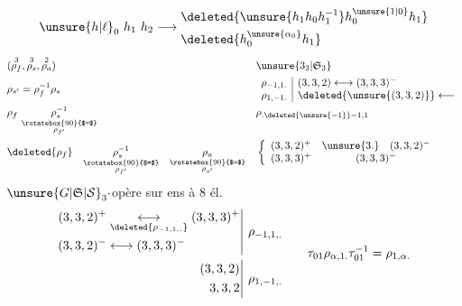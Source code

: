\[
\unsure{h|\ell}_0\ h_1\ h_2\longrightarrow
\begin{aligned}
&\deleted{\unsure{h_1h_0h_1^{-1}}h_0^{\unsure{1|0}}h_1}\\
&\deleted{h_0^{\unsure{\alpha_0}}h_1}
\end{aligned}
\]
\[
\begin{aligned}
 &(\overset{3}{\rho_f},\overset{3}{\rho_s},\overset{2}{\rho_a}) &&\unsure{3_3|\mathfrak S_3}\\
 &\rho_{s'}=\rho_f^{-1}\rho_s &&
 \begin{array}{l|l}
 \rho_{-1,1.}&(3,3,2)\longleftrightarrow(3,3,3)^-\\
 \rho_{1,-1.}&\deleted{\unsure{(3,3,2)}}\longleftarrow
 \end{array}\\
 &\rho_f\ \underset{\substack{\rotatebox{90}{$=$}\\\rho_{f'}}}{\rho_s^{-1}}
 &&\rho_{.\deleted{\unsure{-1}}-1,1}\\
 &\deleted{\rho_f}\quad\underset{\substack{\rotatebox{90}{$=$}\\\rho_{f'}}}{\rho_s^{-1}}\quad
 \underset{\substack{\rotatebox{90}{$=$}\\\rho_{a'}}}{\rho_a}
 &&\left\{\begin{array}{cc}(3,3,2)^+&\unsure{3.}\quad(3,3,2)^-\\
 (3,3,3)^+&(3,3,3)^-\end{array}\right.
\end{aligned}
\]
${\unsure{G|\mathfrak S|\mathcal S}}_3\cdot$\qquad opère sur  ens à $8$ él.
\[
\begin{aligned}
\left.\begin{aligned}
 (3,3,2)^+ &\underset{\deleted{\rho_{-1,1,.}}}{\longleftrightarrow}(3,3,3)^+\\
 (3,3,2)^- &\longleftrightarrow(3,3,3)^-
\end{aligned}\right|&\ \rho_{-1,1,.}\\
\left.\begin{aligned}
 (3,3,2)\\ 3,3,2
\end{aligned}\right|&\ \rho_{1,-1,.}
\end{aligned}
\qquad
\tau_{01}\rho_{\alpha,1.}\tau_{01}^{-1}=\rho_{1,\alpha.}
\]
